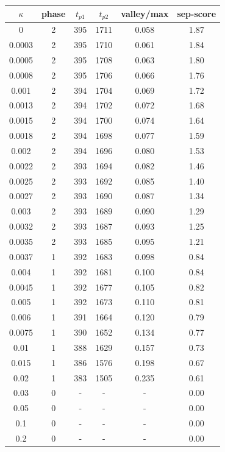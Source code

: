 \begin{tabular}{@{}cccccc@{}}
\toprule
$\kappa$ & phase & $t_{p1}$ & $t_{p2}$ & valley/max & sep-score \\
\midrule
0 & 2 & 395 & 1711 & 0.058 & 1.87 \\
0.0003 & 2 & 395 & 1710 & 0.061 & 1.84 \\
0.0005 & 2 & 395 & 1708 & 0.063 & 1.80 \\
0.0008 & 2 & 395 & 1706 & 0.066 & 1.76 \\
0.001 & 2 & 394 & 1704 & 0.069 & 1.72 \\
0.0013 & 2 & 394 & 1702 & 0.072 & 1.68 \\
0.0015 & 2 & 394 & 1700 & 0.074 & 1.64 \\
0.0018 & 2 & 394 & 1698 & 0.077 & 1.59 \\
0.002 & 2 & 394 & 1696 & 0.080 & 1.53 \\
0.0022 & 2 & 393 & 1694 & 0.082 & 1.46 \\
0.0025 & 2 & 393 & 1692 & 0.085 & 1.40 \\
0.0027 & 2 & 393 & 1690 & 0.087 & 1.34 \\
0.003 & 2 & 393 & 1689 & 0.090 & 1.29 \\
0.0032 & 2 & 393 & 1687 & 0.093 & 1.25 \\
0.0035 & 2 & 393 & 1685 & 0.095 & 1.21 \\
0.0037 & 1 & 392 & 1683 & 0.098 & 0.84 \\
0.004 & 1 & 392 & 1681 & 0.100 & 0.84 \\
0.0045 & 1 & 392 & 1677 & 0.105 & 0.82 \\
0.005 & 1 & 392 & 1673 & 0.110 & 0.81 \\
0.006 & 1 & 391 & 1664 & 0.120 & 0.79 \\
0.0075 & 1 & 390 & 1652 & 0.134 & 0.77 \\
0.01 & 1 & 388 & 1629 & 0.157 & 0.73 \\
0.015 & 1 & 386 & 1576 & 0.198 & 0.67 \\
0.02 & 1 & 383 & 1505 & 0.235 & 0.61 \\
0.03 & 0 & - & - & - & 0.00 \\
0.05 & 0 & - & - & - & 0.00 \\
0.1 & 0 & - & - & - & 0.00 \\
0.2 & 0 & - & - & - & 0.00 \\
\bottomrule
\end{tabular}
